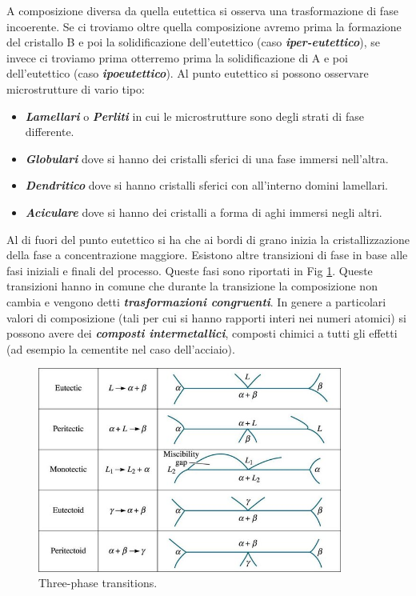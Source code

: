 A composizione diversa da quella eutettica si osserva una trasformazione di fase incoerente. Se ci troviamo oltre quella composizione avremo prima la formazione del cristallo B e poi la solidificazione dell'eutettico (caso \textbf{\textit{iper-eutettico}}), se invece ci troviamo prima otterremo prima la solidificazione di A e poi dell'eutettico (caso \textbf{\textit{ipoeutettico}}).
Al punto eutettico si possono osservare microstrutture di vario tipo:

\begin{itemize}
    \item \textbf{\textit{Lamellari}} o \textbf{\textit{Perliti}} in cui le microstrutture sono degli strati di fase differente.
    \item \textbf{\textit{Globulari}} dove si hanno dei cristalli sferici di una fase immersi nell'altra.
    \item \textbf{\textit{Dendritico}} dove si hanno cristalli sferici con all'interno domini lamellari.
    \item \textbf{\textit{Aciculare}} dove si hanno dei cristalli a forma di aghi immersi negli altri.
\end{itemize}

Al di fuori del punto eutettico si ha che ai bordi di grano inizia la cristallizzazione della fase a concentrazione maggiore.
Esistono altre transizioni di fase in base alle fasi iniziali e finali del processo. Queste fasi sono riportati in Fig \ref{three-phase-reactions}. Queste transizioni hanno in comune che durante la transizione la composizione non cambia e vengono detti \textbf{\textit{trasformazioni congruenti}}.
In genere a particolari valori di composizione (tali per cui si hanno rapporti interi nei numeri atomici) si possono avere dei \textbf{\textit{composti intermetallici}}, composti chimici a tutti gli effetti (ad esempio la cementite nel caso dell'acciaio).

\begin{figure}[h]
    \centering
    \includegraphics[width=10cm]{Diagrammi di fase/three-phase-reacctions.jpg}
    \caption{Three-phase transitions.}
    \label{three-phase-reactions}
\end{figure}